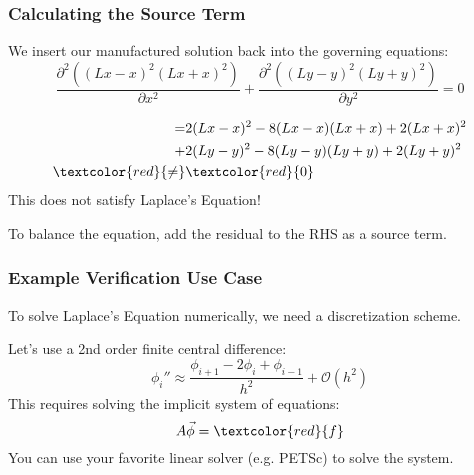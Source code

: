 \documentclass[mathserif]{beamer}
\begin{document}

\begin{frame}
  \frametitle{Calculating the Source Term}

  We insert our manufactured solution back into the governing equations:
  \begin{equation}
      \nonumber
    \frac{\partial^2 ((Lx-x)^2 (Lx+x)^2)}{\partial x^2} + \frac{\partial^2 ((Ly-y)^2 (Ly+y)^2)}{\partial y^2} = 0
  \end{equation}

  \begin{equation}
    \begin{split}
      \nonumber      
      = & 2 (Lx-x)^2 - 8 (Lx-x)(Lx+x) + 2 (Lx+x)^2 \\
      + & 2 (Ly-y)^2 - 8 (Ly-y)(Ly+y) + 2 (Ly+y)^2 \\
      \textcolor{red}{\neq} & \textcolor{red}{0}
    \end{split}
  \end{equation}
  This does not satisfy Laplace's Equation!
  \newline
  \newline
  \begin{block}{}
    To balance the equation, add the residual to the RHS as a source term. 
  \end{block}
\end{frame}

\begin{frame}
  \frametitle{Example Verification Use Case}
  \begin{block}{}
    To solve Laplace's Equation numerically, we need a discretization scheme.
  \end{block}
  Let's use a 2nd order finite central difference:
  \begin{equation}
      \nonumber      
    \phi_i'' \approx \frac{\phi_{i+1} - 2\phi_{i} + \phi_{i-1}}{h^2} + \mathcal{O}(h^2)
  \end{equation}
  This requires solving the implicit system of equations: 
  \begin{equation}
      \nonumber      
      A \vec \phi = \textcolor{red}{f}
  \end{equation}
   You can use your favorite linear solver (e.g. PETSc) to solve the
   system.

\end{frame}
\end{document}
